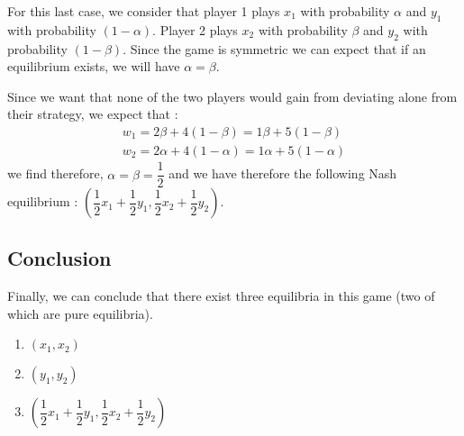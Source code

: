 For this last case, we consider that player 1 plays $x_1$ with probability $\alpha$ and $y_1$ with probability $(1-\alpha)$. Player 2 plays $x_2$ with probability $\beta$ and $y_2$ with probability $(1-\beta)$. Since the game is symmetric we can expect that if an equilibrium exists, we will have $\alpha = \beta$.

Since we want that none of the two players would gain from deviating alone from their strategy, we expect that :
\begin{align*}
w_1 = 2\beta + 4(1-\beta) = 1\beta + 5(1-\beta) \\
w_2 = 2\alpha + 4(1-\alpha) = 1\alpha + 5(1-\alpha)
\end{align*}
we find therefore, $\alpha = \beta = \dfrac{1}{2}$ and we have therefore the following Nash equilibrium : $(\dfrac{1}{2}x_1+\dfrac{1}{2}y_1, \dfrac{1}{2}x_2+\dfrac{1}{2}y_2)$.

\subsection*{Conclusion}

Finally, we can conclude that there exist three equilibria in this game (two of which are pure equilibria).
\begin{enumerate}
	\item $(x_1, x_2)$
	\item $(y_1, y_2)$
	\item $(\dfrac{1}{2}x_1+\dfrac{1}{2}y_1, \dfrac{1}{2}x_2+\dfrac{1}{2}y_2)$
\end{enumerate}
